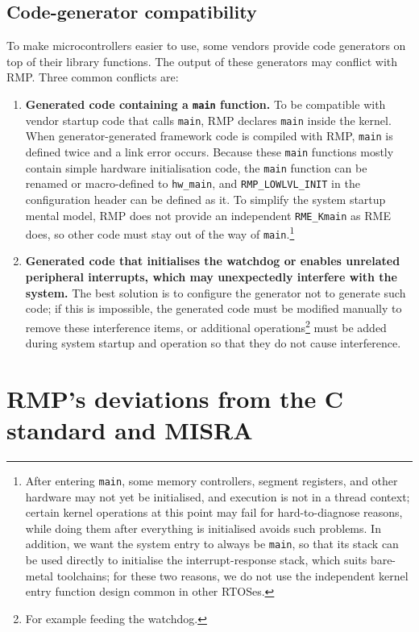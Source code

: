 \subsection{Code-generator compatibility}

To make microcontrollers easier to use, some vendors provide code generators on top of their library functions.
The output of these generators may conflict with RMP.
Three common conflicts are:

\begin{enumerate}
    \item \textbf{Generated code containing a \texttt{main} function.
    }
    To be compatible with vendor startup code that calls \texttt{main}, RMP declares \texttt{main} inside the kernel.
    When generator-generated framework code is compiled with RMP, \texttt{main} is defined twice and a link error occurs.
    Because these \texttt{main} functions mostly contain simple hardware initialisation code, the \texttt{main} function can be renamed or macro-defined to \texttt{hw\_main}, and \texttt{RMP\_LOWLVL\_INIT} in the configuration header can be defined as it.
    To simplify the system startup mental model, RMP does not provide an independent \texttt{RME\_Kmain} as RME does, so other code must stay out of the way of \texttt{main}.\footnote{After entering \texttt{main}, some memory controllers, segment registers, and other hardware may not yet be initialised, and execution is not in a thread context; certain kernel operations at this point may fail for hard-to-diagnose reasons, while doing them after everything is initialised avoids such problems. In addition, we want the system entry to always be \texttt{main}, so that its stack can be used directly to initialise the interrupt-response stack, which suits bare-metal toolchains; for these two reasons, we do not use the independent kernel entry function design common in other RTOSes.}
    \item \textbf{Generated code that initialises the watchdog or enables
    unrelated peripheral interrupts, which may unexpectedly interfere with
    the system.}
    The best solution is to configure the generator not to generate such code; if this is impossible, the generated code must be modified manually to remove these interference items, or additional operations\footnote{For example feeding the watchdog.} must be added during system startup and operation so that they do not cause interference.
\end{enumerate}

\section{RMP's deviations from the C standard and MISRA}

